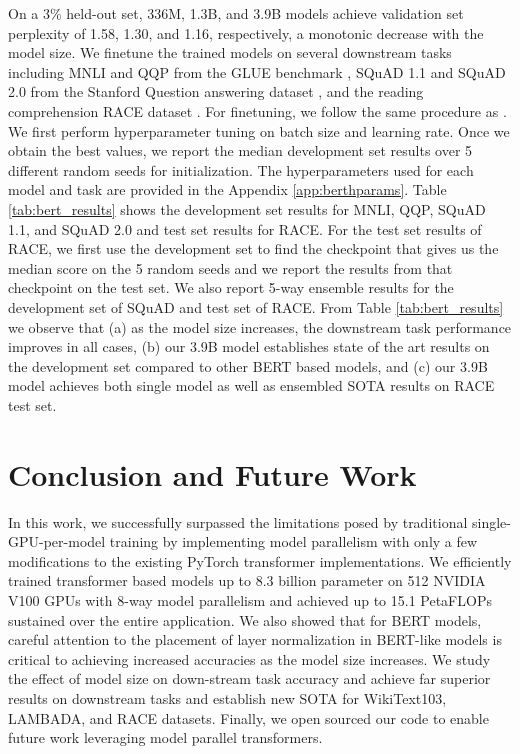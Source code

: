 \documentclass{article}
\begin{document}
On a 3\% held-out set, 336M, 1.3B, and 3.9B models achieve validation set perplexity of 1.58, 1.30, and 1.16, respectively, a monotonic decrease with the model size. We finetune the trained models on several downstream tasks including MNLI and QQP from the GLUE benchmark \cite{GLUE2019}, SQuAD 1.1 and SQuAD 2.0 from the Stanford Question answering dataset \cite{SQUAD1,SQUAD2}, and the reading comprehension RACE dataset \cite{RACE}. For finetuning, we follow the same procedure as \cite{roberta}. We first perform hyperparameter tuning on batch size and learning rate. Once we obtain the best values, we report the median development set results over 5 different random seeds for initialization. The hyperparameters used for each model and task are provided in the Appendix \ref{app:berthparams}. Table \ref{tab:bert_results} shows the development set results for MNLI, QQP, SQuAD 1.1, and SQuAD 2.0 and test set results for RACE. For the test set results of RACE, we first use the development set to find the checkpoint that gives us the median score on the 5 random seeds and we report the results from that checkpoint on the test set. We also report 5-way ensemble results for the development set of SQuAD and test set of RACE. From Table \ref{tab:bert_results} we observe that (a) as the model size increases, the downstream task performance improves in all cases, (b) our 3.9B model establishes state of the art results on the development set compared to other BERT based models, and (c) our 3.9B model achieves both single model as well as ensembled  SOTA results on RACE test set. 

\section{Conclusion and Future Work}

In this work, we successfully surpassed the limitations posed by traditional single-GPU-per-model training by implementing model parallelism with only a few modifications to the existing PyTorch transformer implementations. We efficiently trained transformer based models up to 8.3 billion parameter on 512 NVIDIA V100 GPUs with 8-way model parallelism and achieved up to 15.1 PetaFLOPs sustained over the entire application. We also showed that for BERT models, careful attention to the placement of layer normalization in BERT-like models is critical to achieving increased accuracies as the model size increases. We study the effect of model size on down-stream task accuracy and achieve far superior results on downstream tasks and establish new SOTA for WikiText103, LAMBADA, and RACE datasets. Finally, we open sourced our code to enable future work leveraging model parallel transformers.
\end{document}
